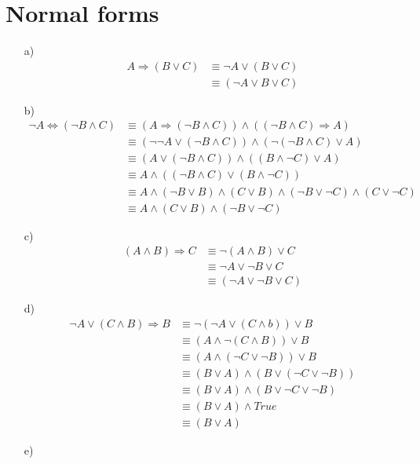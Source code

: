 \documentclass[a4paper]{article}
\begin{document}
\section{Normal forms}
\begin{itemize}
	\item[a)]
		\begin{align*}
			A \Rightarrow (B \lor C) &\equiv \neg A \lor (B \lor C) \\
			&\equiv (\neg A \lor B \lor C)
		\end{align*}
	\item[b)]
		\begin{align*}
			\neg A \Leftrightarrow (\neg B \land C) &\equiv (A \Rightarrow (\neg B \land C)) \land ((\neg B \land C) \Rightarrow A) \\
			&\equiv (\neg \neg A \lor (\neg B \land C)) \land (\neg(\neg B \land C) \lor A) \\
			&\equiv (A \lor (\neg B \land C)) \land ((B \land  \neg C) \lor A) \\
			&\equiv A \land ((\neg B \land C) \lor (B \land \neg C))\\
			&\equiv A \land (\neg B \lor B) \land (C \lor B) \land (\neg B \lor \neg C) \land (C \lor \neg C) \\
			&\equiv A \land (C \lor B)  \land (\neg B \lor \neg C)
		\end{align*}
	\item[c)]
		\begin{align*}
			(A \land B) \Rightarrow C &\equiv \neg(A \land B) \lor C \\
			&\equiv \neg A \lor \neg B \lor C \\
			&\equiv (\neg A \lor \neg B \lor C)
		\end{align*}
	\item[d)]
		\begin{align*}
			\neg A \lor (C \land B) \Rightarrow B &\equiv \neg(\neg A \lor (C \land b)) \lor B \\
			&\equiv (A \land \neg(C \land B)) \lor B \\
			&\equiv (A \land (\neg C \lor \neg B)) \lor B\\
			&\equiv (B \lor A) \land (B \lor (\neg C \lor \neg B)) \\
			&\equiv (B \lor A)  \land (B \lor \neg C \lor \neg B) \\
			&\equiv (B \lor A)  \land True \\
			&\equiv (B \lor A)
		\end{align*}
	\item[e)]

\end{itemize}
\end{document}
